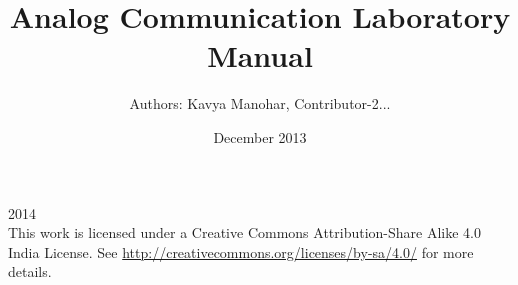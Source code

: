 \documentclass{book}
\begin{document}
\thispagestyle{empty}
\thispagestyle{empty}

\title{Analog Communication
Laboratory Manual}
\date{December 2013}
\author {Authors: Kavya Manohar, Contributor-2...}
\maketitle
  
\textcopyright{}2014
\\[2cm]
This work is licensed under a Creative Commons Attribution-Share Alike 4.0 India License. See \url{http://creativecommons.org/licenses/by-sa/4.0/} for more details.






\thispagestyle{empty}
\tableofcontents
\thispagestyle{empty}
\thispagestyle{empty}

\listoffigures
\thispagestyle{empty}





















\begin{appendix}

\end{appendix}
\begin{thebibliography}{1}

\end{thebibliography}
\end{document}
